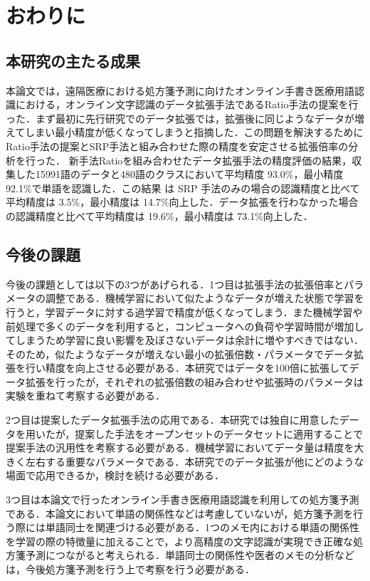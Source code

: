 
\chapter{おわりに}
\label{cha:conclu}

\section{本研究の主たる成果}
\label{sec:main-result}

本論文では，遠隔医療における処方箋予測に向けたオンライン手書き医療用語認識における，オンライン文字認識のデータ拡張手法であるRatio手法の提案を行った．まず最初に先行研究でのデータ拡張では，拡張後に同じようなデータが増えてしまい最小精度が低くなってしまうと指摘した．この問題を解決するためにRatio手法の提案とSRP手法と組み合わせた際の精度を安定させる拡張倍率の分析を行った．
新手法Ratioを組み合わせたデータ拡張手法の精度評価の結果，収集した15991語のデータと480語のクラスにおいて平均精度 93.0\%，最小精度 92.1\%で単語を認識した．この結果 は SRP 手法のみの場合の認識精度と比べて平均精度は 3.5\%，最小精度は 14.7\%向上した．データ拡張を行わなかった場合の認識精度と比べて平均精度は 19.6\%，最小精度は 73.1\%向上した．
\section{今後の課題}
\label{sec:future}
今後の課題としては以下の3つがあげられる．1つ目は拡張手法の拡張倍率とパラメータの調整である．機械学習において似たようなデータが増えた状態で学習を行うと，学習データに対する過学習で精度が低くなってしまう．また機械学習や前処理で多くのデータを利用すると，コンピュータへの負荷や学習時間が増加してしまうため学習に良い影響を及ぼさないデータは余計に増やすべきではない．そのため，似たようなデータが増えない最小の拡張倍数・パラメータでデータ拡張を行い精度を向上させる必要がある．本研究ではデータを100倍に拡張してデータ拡張を行ったが，それぞれの拡張倍数の組み合わせや拡張時のパラメータは実験を重ねて考察する必要がある．

2つ目は提案したデータ拡張手法の応用である．本研究では独自に用意したデータを用いたが，提案した手法をオープンセットのデータセットに適用することで提案手法の汎用性を考察する必要がある．機械学習においてデータ量は精度を大きく左右する重要なパラメータである．本研究でのデータ拡張が他にどのような場面で応用できるか，検討を続ける必要がある．

3つ目は本論文で行ったオンライン手書き医療用語認識を利用しての処方箋予測である．本論文において単語の関係性などは考慮していないが，処方箋予測を行う際には単語同士を関連づける必要がある．1つのメモ内における単語の関係性を学習の際の特徴量に加えることで，より高精度の文字認識が実現でき正確な処方箋予測につながると考えられる．単語同士の関係性や医者のメモの分析などは，今後処方箋予測を行う上で考察を行う必要がある．
